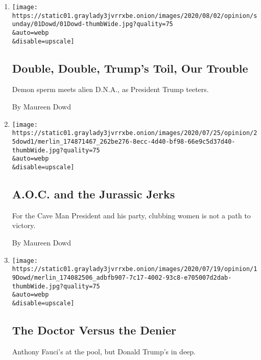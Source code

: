 \begin{enumerate}
\def\labelenumi{\arabic{enumi}.}
\item
  \href{/2020/08/01/opinion/columnists/trump-coronavirus-herman-cain.html}{}

  \texttt{[image: https://static01.graylady3jvrrxbe.onion/images/2020/08/02/opinion/sunday/01Dowd/01Dowd-thumbWide.jpg?quality=75\\\&auto=webp\\\&disable=upscale]}

  \hypertarget{double-double-trumps-toil-our-trouble}{%
  \subsection{Double, Double, Trump's Toil, Our
  Trouble}\label{double-double-trumps-toil-our-trouble}}

  Demon sperm meets alien D.N.A., as President Trump teeters.

  By Maureen Dowd
\item
  \href{/2020/07/25/opinion/sunday/aoc-yoho-trump-2020.html}{}

  \texttt{[image: https://static01.graylady3jvrrxbe.onion/images/2020/07/25/opinion/25dowd1/merlin\_174871467\_262be276-8ecc-4d40-bf98-66e9c5d37d40-thumbWide.jpg?quality=75\\\&auto=webp\\\&disable=upscale]}

  \hypertarget{aoc-and-the-jurassic-jerks}{%
  \subsection{A.O.C. and the Jurassic
  Jerks}\label{aoc-and-the-jurassic-jerks}}

  For the Cave Man President and his party, clubbing women is not a path
  to victory.

  By Maureen Dowd
\item
  \href{/2020/07/18/opinion/sunday/fauci-trump-coronavirus.html}{}

  \texttt{[image: https://static01.graylady3jvrrxbe.onion/images/2020/07/19/opinion/19Dowd/merlin\_174082506\_adbfb907-7c17-4002-93c8-e705007d2dab-thumbWide.jpg?quality=75\\\&auto=webp\\\&disable=upscale]}

  \hypertarget{the-doctor-versus-the-denier}{%
  \subsection{The Doctor Versus the
  Denier}\label{the-doctor-versus-the-denier}}

  Anthony Fauci's at the pool, but Donald Trump's in deep.


\end{enumerate}
